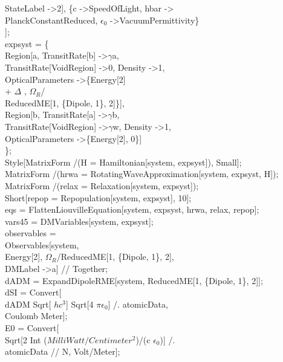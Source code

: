 \begin{enumerate}
    StateLabel -\textgreater 2], \{c -\textgreater SpeedOfLight, hbar -\textgreater \\
     PlanckConstantReduced, $\epsilon_0$ -\textgreater VacuumPermittivity\}\\
   ];\\
expsyst = \{\\
   Region[a, TransitRate[b] -\textgreater $\gamma$a, \\
    TransitRate[VoidRegion] -\textgreater 0, Density -\textgreater 1, \\
    OpticalParameters -\textgreater \{Energy[2]\\
         + $\Delta$ , $\Omega_R$/\\
       ReducedME[1, \{Dipole, 1\}, 2]\}],\\
   Region[b, TransitRate[a] -\textgreater $\gamma$b, \\
    TransitRate[VoidRegion] -\textgreater $\gamma$w, Density -\textgreater 1, \\
    OpticalParameters -\textgreater \{Energy[2], 0\}]\\
   \};\\
Style[MatrixForm /\@ (H = Hamiltonian[system, expsyst]), Small];\\
MatrixForm /\@ (hrwa = RotatingWaveApproximation[system, expsyst, H]);\\
MatrixForm /\@ (relax = Relaxation[system, expsyst]);\\
Short[repop = Repopulation[system, expsyst], 10];\\
eqs = Flatten\@ LiouvilleEquation[system, expsyst, hrwa, relax, repop];\\
vars45 = DMVariables[system, expsyst];\\
observables = \\
Observables[system, \\
    Energy[2], $\Omega_R$/ReducedME[1, \{Dipole, 1\}, 2], \\
    DMLabel -\textgreater a] // Together;\\
dADM = ExpandDipoleRME[system, ReducedME[1, \{Dipole, 1\}, 2]];\\
dSI = Convert[\\
dADM Sqrt[ $hc^3$] Sqrt[4 $\pi\epsilon_0$] /. atomicData, \\
   Coulomb Meter];\\
E0 = Convert[\\
   Sqrt[2 Int ($Milli Watt/Centimeter^2$)/(c $\epsilon_0$)] /. \\
     atomicData // N, Volt/Meter];\\

\end{enumerate}
